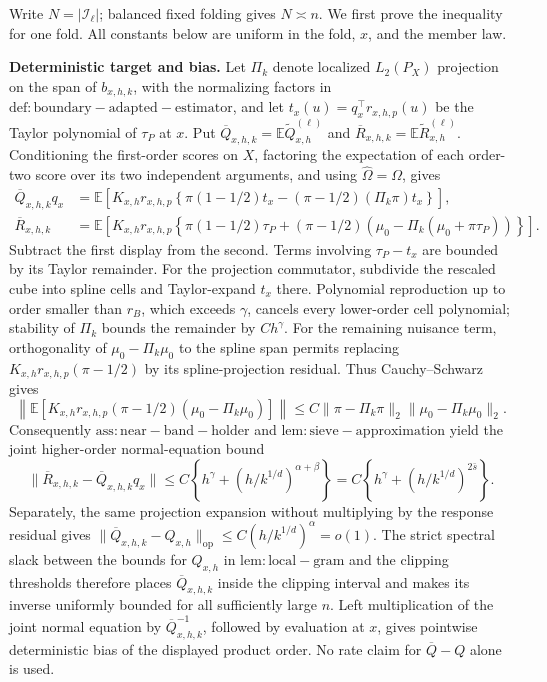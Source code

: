 Write \(N=|\mathcal I_\ell|\); balanced fixed folding gives \(N\asymp n\). We first prove the inequality for one fold. All constants below are uniform in the fold, \(x\), and the member law.

\textbf{Deterministic target and bias.} Let \(\Pi_k\) denote localized \(L_2(P_X)\) projection on the span of \(b_{x,h,k}\), with the normalizing factors in \(\mathrm{def:boundary-adapted-estimator}\), and let \(t_x(u)=q_x^\top r_{x,h,p}(u)\) be the Taylor polynomial of \(\tau_P\) at \(x\). Put \(\overline Q_{x,h,k}=\mathbb E\widetilde Q_{x,h}^{(\ell)}\) and \(\overline R_{x,h,k}=\mathbb E\widetilde R_{x,h}^{(\ell)}\). Conditioning the first-order scores on \(X\), factoring the expectation of each order-two score over its two independent arguments, and using \(\widehat\Omega=\Omega\), gives
\[
\begin{aligned}
\overline Q_{x,h,k}q_x
 &=\mathbb E\!\left[K_{x,h}r_{x,h,p}
 \left\{\pi(1-1/2)t_x-(\pi-1/2)(\Pi_k\pi)t_x\right\}\right],\\
\overline R_{x,h,k}
 &=\mathbb E\!\left[K_{x,h}r_{x,h,p}
 \left\{\pi(1-1/2)\tau_P+(\pi-1/2)
 \left(\mu_0-\Pi_k(\mu_0+\pi\tau_P)\right)\right\}\right].
\end{aligned}
\]
Subtract the first display from the second. Terms involving \(\tau_P-t_x\) are bounded by its Taylor remainder. For the projection commutator, subdivide the rescaled cube into spline cells and Taylor-expand \(t_x\) there. Polynomial reproduction up to order smaller than \(r_B\), which exceeds \(\gamma\), cancels every lower-order cell polynomial; stability of \(\Pi_k\) bounds the remainder by \(Ch^\gamma\). For the remaining nuisance term, orthogonality of \(\mu_0-\Pi_k\mu_0\) to the spline span permits replacing \(K_{x,h}r_{x,h,p}(\pi-1/2)\) by its spline-projection residual. Thus Cauchy--Schwarz gives
\[
\left\|\mathbb E\!\left[K_{x,h}r_{x,h,p}(\pi-1/2)
 (\mu_0-\Pi_k\mu_0)\right]\right\|
 \le C\|\pi-\Pi_k\pi\|_2\|\mu_0-\Pi_k\mu_0\|_2.
\]
Consequently \(\mathrm{ass:near-band-holder}\) and \(\mathrm{lem:sieve-approximation}\) yield the joint higher-order normal-equation bound
\[
\|\overline R_{x,h,k}-\overline Q_{x,h,k}q_x\|
 \le C\left\{h^\gamma+(h/k^{1/d})^{\alpha+\beta}\right\}
 =C\left\{h^\gamma+(h/k^{1/d})^{2\bar s}\right\}.
\]
Separately, the same projection expansion without multiplying by the response residual gives \(\|\overline Q_{x,h,k}-Q_{x,h}\|_{\mathrm{op}}\le C(h/k^{1/d})^\alpha=o(1)\). The strict spectral slack between the bounds for \(Q_{x,h}\) in \(\mathrm{lem:local-gram}\) and the clipping thresholds therefore places \(\overline Q_{x,h,k}\) inside the clipping interval and makes its inverse uniformly bounded for all sufficiently large \(n\). Left multiplication of the joint normal equation by \(\overline Q_{x,h,k}^{-1}\), followed by evaluation at \(x\), gives pointwise deterministic bias of the displayed product order. No rate claim for \(\overline Q-Q\) alone is used.

